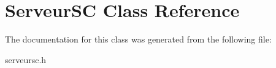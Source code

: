 \hypertarget{classServeurSC}{}\section{Serveur\+SC Class Reference}
\label{classServeurSC}


The documentation for this class was generated from the following file\+:\begin{DoxyCompactItemize}
\item 
serveursc.\+h\end{DoxyCompactItemize}
